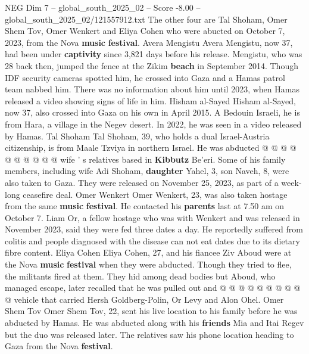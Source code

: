 \begin{textsample}{NEG Dim 7 – global\_south\_2025\_02 – Score -8.00 – global\_south\_2025\_02/121557912.txt}  \label{ex:f7_neg_266}
The other four are Tal Shoham, Omer Shem Tov, Omer Wenkert and Eliya Cohen who were abucted on October 7, 2023, from the Nova \textbf{music} \textbf{festival}.
Avera Mengistu Avera Mengistu, now 37, had been under \textbf{captivity} since 3,821 days before his release.
Mengistu, who was 28 back then, jumped the fence at the Zikim \textbf{beach} in September 2014.
Though IDF security cameras spotted him, he crossed into Gaza and a Hamas patrol team nabbed him.
There was no information about him until 2023, when Hamas released a video showing signs of life in him.
Hisham al-Sayed Hisham al-Sayed, now 37, also crossed into Gaza on his own in April 2015.
A Bedouin Israeli, he is from Hara, a village in the Negev desert.
In 2022, he was seen in a video released by Hamas.
Tal Shoham Tal Shoham, 39, who holds a dual Israel-Austria citizenship, is from Maale Tzviya in northern Israel.
He was abducted @ @ @ @ @ @ @ @ @ @ wife ' s relatives based in \textbf{Kibbutz} Be'eri.
Some of his family members, including wife Adi Shoham, \textbf{daughter} Yahel, 3, son Naveh, 8, were also taken to Gaza.
They were released on November 25, 2023, as part of a week-long ceasefire deal.
Omer Wenkert Omer Wenkert, 23, was also taken hostage from the same \textbf{music} \textbf{festival}.
He contacted his \textbf{parents} last at 7.50 am on October 7.
Liam Or, a fellow hostage who was with Wenkert and was released in November 2023, said they were fed three dates a day.
He reportedly suffered from colitis and people diagnosed with the disease can not eat dates due to its dietary fibre content.
Eliya Cohen Eliya Cohen, 27, and his fiancee Ziv Aboud were at the Nova \textbf{music} \textbf{festival} when they were abducted.
Though they tried to flee, the militants fired at them.
They hid among dead bodies but Aboud, who managed escape, later recalled that he was pulled out and @ @ @ @ @ @ @ @ @ @ vehicle that carried Hersh Goldberg-Polin, Or Levy and Alon Ohel.
Omer Shem Tov Omer Shem Tov, 22, sent his live location to his family before he was abducted by Hamas.
He was abducted along with his \textbf{friends} Mia and Itai Regev but the duo was released later.
The relatives saw his phone location heading to Gaza from the Nova \textbf{festival}.

\end{textsample}
